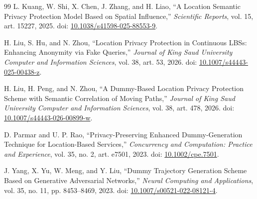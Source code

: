 \documentclass[12pt,a4paper,oneside]{report}
\begin{document}
\begin{thebibliography}{99}
L. Kuang, W. Shi, X. Chen, J. Zhang, and H. Liao,
``A Location Semantic Privacy Protection Model Based on Spatial Influence,''
\emph{Scientific Reports}, vol. 15, art. 15227, 2025.
doi: \href{https://doi.org/10.1038/s41598-025-88553-9}{10.1038/s41598-025-88553-9}.

H. Liu, S. Hu, and N. Zhou,
``Location Privacy Protection in Continuous LBSs: Enhancing Anonymity via Fake Queries,''
\emph{Journal of King Saud University Computer and Information Sciences},
vol. 38, art. 53, 2026.
doi: \href{https://doi.org/10.1007/s44443-025-00438-z}{10.1007/s44443-025-00438-z}.

H. Liu, H. Peng, and N. Zhou,
``A Dummy-Based Location Privacy Protection Scheme with Semantic Correlation of Moving Paths,''
\emph{Journal of King Saud University Computer and Information Sciences},
vol. 38, art. 478, 2026.
doi: \href{https://doi.org/10.1007/s44443-026-00899-w}{10.1007/s44443-026-00899-w}.

D. Parmar and U. P. Rao,
``Privacy-Preserving Enhanced Dummy-Generation Technique for Location-Based Services,''
\emph{Concurrency and Computation: Practice and Experience}, vol. 35, no. 2,
art. e7501, 2023.
doi: \href{https://doi.org/10.1002/cpe.7501}{10.1002/cpe.7501}.

J. Yang, X. Yu, W. Meng, and Y. Liu,
``Dummy Trajectory Generation Scheme Based on Generative Adversarial Networks,''
\emph{Neural Computing and Applications}, vol. 35, no. 11, pp. 8453--8469, 2023.
doi: \href{https://doi.org/10.1007/s00521-022-08121-4}{10.1007/s00521-022-08121-4}.

\end{thebibliography}
\endgroup
\end{document}
